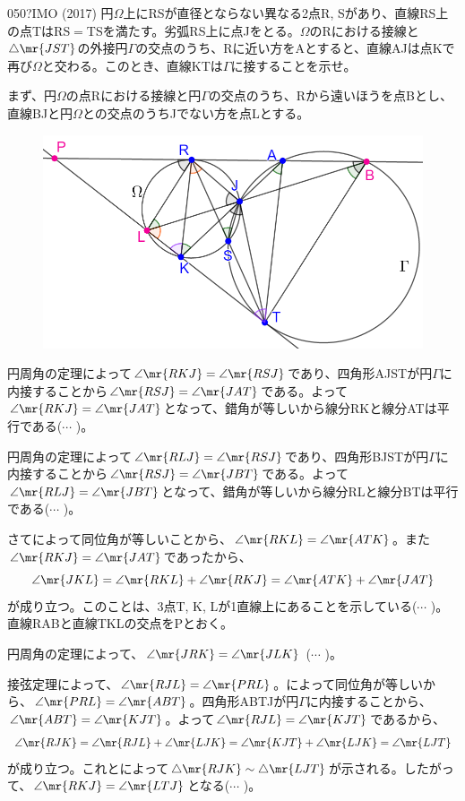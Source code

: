 \begin{thm}{050}{\hosi ?}{IMO (2017)}
 円$\Omega$上にRSが直径とならない異なる2点R, Sがあり、直線RS上の点TはRS$=$TSを満たす。劣弧RS上に点Jをとる。$\Omega$のRにおける接線と$\triangle\mr{JST}$の外接円$\Gamma$の交点のうち、Rに近い方をAとすると、直線AJは点Kで再び$\Omega$と交わる。このとき、直線KTは$\Gamma$に接することを示せ。
\end{thm}

まず、円$\Omega$の点Rにおける接線と円$\Gamma$の交点のうち、Rから遠いほうを点Bとし、直線BJと円$\Omega$との交点のうちJでない方を点Lとする。

\begin{figure}[H]
 \centering
 \includegraphics[width=0.8\linewidth]{../problems/Q_050/A_050.png}
\end{figure}

円周角の定理によって$\angle\mr{RKJ}=\angle\mr{RSJ}$であり、四角形AJSTが円$\Gamma$に内接することから$\angle\mr{RSJ}=\angle\mr{JAT}$である。よって$\angle\mr{RKJ}=\angle\mr{JAT}$となって、錯角が等しいから線分RKと線分ATは平行である($\cdots$ )。

円周角の定理によって$\angle\mr{RLJ}=\angle\mr{RSJ}$であり、四角形BJSTが円$\Gamma$に内接することから$\angle\mr{RSJ}=\angle\mr{JBT}$である。よって$\angle\mr{RLJ}=\angle\mr{JBT}$となって、錯角が等しいから線分RLと線分BTは平行である($\cdots$ )。

さてによって同位角が等しいことから、$\angle\mr{RKL}=\angle\mr{ATK}$。また$\angle\mr{RKJ}=\angle\mr{JAT}$であったから、
\[ \angle\mr{JKL}=\angle\mr{RKL}+\angle\mr{RKJ}=\angle\mr{ATK}+\angle\mr{JAT} \]
が成り立つ。このことは、3点T, K, Lが1直線上にあることを示している($\cdots$ )。直線RABと直線TKLの交点をPとおく。

円周角の定理によって、$\angle\mr{JRK}=\angle\mr{JLK}$ ($\cdots$ )。

接弦定理によって、$\angle\mr{RJL}=\angle\mr{PRL}$。によって同位角が等しいから、$\angle\mr{PRL}=\angle\mr{ABT}$。四角形ABTJが円$\Gamma$に内接することから、$\angle\mr{ABT}=\angle\mr{KJT}$。よって$\angle\mr{RJL}=\angle\mr{KJT}$であるから、
\[ \angle\mr{RJK}=\angle\mr{RJL}+\angle\mr{LJK}=\angle\mr{KJT}+\angle\mr{LJK}=\angle\mr{LJT} \]
が成り立つ。これとによって$\triangle\mr{RJK}\sim\triangle\mr{LJT}$が示される。したがって、$\angle\mr{RKJ}=\angle\mr{LTJ}$となる($\cdots$ )。

